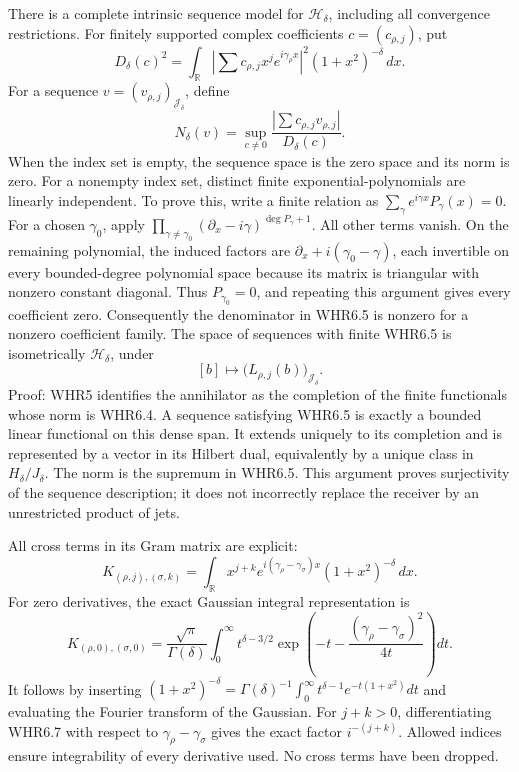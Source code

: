 There is a complete intrinsic sequence model for \(\mathcal H_\delta\),
including all convergence restrictions. For finitely supported complex
coefficients \(c=(c_{\rho,j})\), put \[
 D_\delta(c)^2=
 \int_{\mathbb R}\left|\sum c_{\rho,j}x^je^{i\gamma_\rho x}\right|^2
                         (1+x^2)^{-\delta}\,dx.
 \tag{WHR6.4}
\] For a sequence \(v=(v_{\rho,j})_{\mathscr J_\delta}\), define \[
 N_\delta(v)=\sup_{c\ne0}
       \frac{|\sum c_{\rho,j}v_{\rho,j}|}{D_\delta(c)}.
 \tag{WHR6.5}
\] When the index set is empty, the sequence space is the zero space and
its norm is zero. For a nonempty index set, distinct finite
exponential-polynomials are linearly independent. To prove this, write a
finite relation as \(\sum_\gamma e^{i\gamma x}P_\gamma(x)=0\). For a
chosen \(\gamma_0\), apply
\(\prod_{\gamma\ne\gamma_0}(\partial_x-i\gamma)^{\deg P_\gamma+1}\). All
other terms vanish. On the remaining polynomial, the induced factors are
\(\partial_x+i(\gamma_0-\gamma)\), each invertible on every
bounded-degree polynomial space because its matrix is triangular with
nonzero constant diagonal. Thus \(P_{\gamma_0}=0\), and repeating this
argument gives every coefficient zero. Consequently the denominator in
WHR6.5 is nonzero for a nonzero coefficient family. The space of
sequences with finite WHR6.5 is isometrically \(\mathcal H_\delta\),
under \[
 [b]\longmapsto\bigl(L_{\rho,j}(b)\bigr)_{\mathscr J_\delta}.
 \tag{WHR6.6}
\] Proof: WHR5 identifies the annihilator as the completion of the
finite functionals whose norm is WHR6.4. A sequence satisfying WHR6.5 is
exactly a bounded linear functional on this dense span. It extends
uniquely to its completion and is represented by a vector in its Hilbert
dual, equivalently by a unique class in \(H_\delta/J_\delta\). The norm
is the supremum in WHR6.5. This argument proves surjectivity of the
sequence description; it does not incorrectly replace the receiver by an
unrestricted product of jets.

All cross terms in its Gram matrix are explicit: \[
 K_{(\rho,j),(\sigma,k)}=
 \int_{\mathbb R}x^{j+k}e^{i(\gamma_\rho-\gamma_\sigma)x}
                                     (1+x^2)^{-\delta}\,dx.
 \tag{WHR6.7}
\] For zero derivatives, the exact Gaussian integral representation is
\[
 K_{(\rho,0),(\sigma,0)}=
 \frac{\sqrt\pi}{\Gamma(\delta)}
 \int_0^\infty t^{\delta-3/2}
     \exp\!\left(-t-\frac{(\gamma_\rho-\gamma_\sigma)^2}{4t}\right)dt.
 \tag{WHR6.8}
\] It follows by inserting
\((1+x^2)^{-\delta}=\Gamma(\delta)^{-1}\int_0^\infty t^{\delta-1}e^{-t(1+x^2)}dt\)
and evaluating the Fourier transform of the Gaussian. For \(j+k>0\),
differentiating WHR6.7 with respect to \(\gamma_\rho-\gamma_\sigma\)
gives the exact factor \(i^{-(j+k)}\). Allowed indices ensure
integrability of every derivative used. No cross terms have been
dropped.

